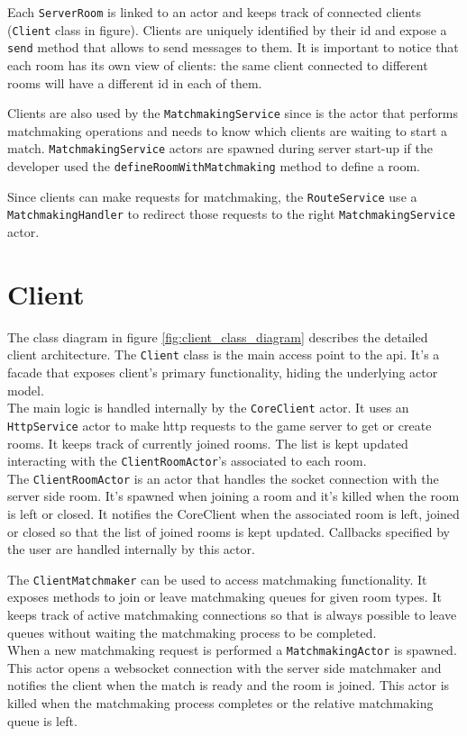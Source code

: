 Each \texttt{ServerRoom} is linked to an actor and keeps track of connected clients (\texttt{Client} class in figure). Clients are uniquely identified by their id and expose a \texttt{send} method that allows to send messages to them. It is important to notice that each room has its own view of clients: the same client connected to different rooms will have a different id in each of them. 

Clients are also used by the \texttt{MatchmakingService} since is the actor that performs matchmaking operations and needs to know which clients are waiting to start a match. \texttt{MatchmakingService} actors are spawned during server start-up if the developer used the \texttt{defineRoomWithMatchmaking} method to define a room.

Since clients can make requests for matchmaking, the \texttt{RouteService} use a \texttt{MatchmakingHandler} to redirect those requests to the right \texttt{MatchmakingService} actor.


\section{Client}

The class diagram in figure \ref{fig:client_class_diagram} describes the detailed client architecture.
The \texttt{Client} class is the main access point to the api. It's a facade that exposes client's primary functionality, hiding the underlying actor model.  
\\
The main logic is handled internally by the \texttt{CoreClient} actor. It uses an \texttt{HttpService} actor to make http requests to the game server to get or create rooms. 
It keeps track of currently joined rooms. The list is kept updated interacting with the \texttt{ClientRoomActor}'s associated to each room.
\\
The \texttt{ClientRoomActor} is an actor that handles the socket connection with the server side room. 
It's spawned when joining a room and it's killed when the room is left or closed.  It notifies the CoreClient when the associated room is left, joined or closed so that the list of joined rooms is kept updated. 
Callbacks specified by the user are handled internally by this actor.

The \texttt{ClientMatchmaker} can be used to access matchmaking functionality. It exposes methods to join or leave matchmaking queues for given room types. It keeps track of active matchmaking connections so that is always possible to leave queues without waiting the matchmaking process to be completed.
\\
When a new matchmaking request is performed a \texttt{MatchmakingActor} is spawned. 
This actor opens a websocket connection with the server side matchmaker and notifies the client when the match is ready and the room is joined. This actor is killed when the matchmaking process completes or the relative matchmaking queue is left.

